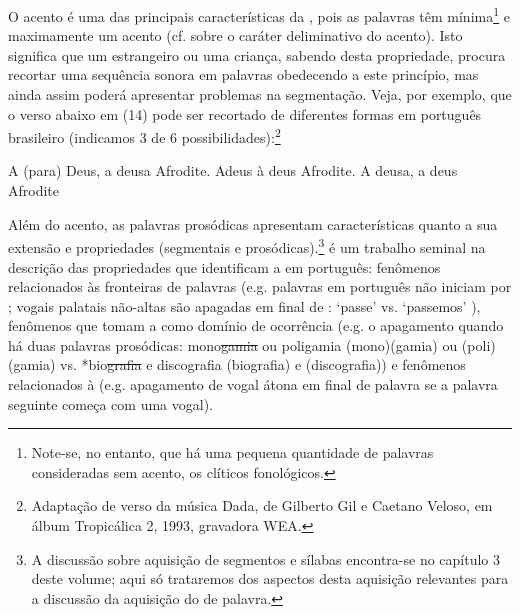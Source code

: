 \documentclass[output=paper]{LSP/langsci}
\begin{document}
O acento é uma das principais características da , pois as palavras têm mínima\footnote{Note-se, no entanto, que há uma pequena quantidade de palavras consideradas sem acento, os clíticos fonológicos.} e maximamente um acento (cf. \citealt{jakobson1941} sobre o caráter deliminativo do acento). Isto significa que um estrangeiro ou uma criança, sabendo desta propriedade, procura recortar uma sequência sonora em palavras obedecendo a este princípio, mas ainda assim poderá apresentar problemas na segmentação. Veja, por exemplo, que o verso abaixo em (14) pode ser recortado de diferentes formas em português brasileiro (indicamos 3 de 6 possibilidades):\footnote{Adaptação de verso da música Dada, de Gilberto Gil e Caetano Veloso, em álbum Tropicálica 2, 1993, gravadora WEA.}\newpage

\ea\label{ex:santana_14}
\ea\label{ex:santana_14a}
A (para) Deus, a deusa Afrodite.
\ex\label{ex:santana_14b}
Adeus à deus Afrodite.
\ex\label{ex:santana_14c}
A deusa, a deus Afrodite
\zl

Além do acento, as palavras prosódicas apresentam características quanto a sua extensão e propriedades (segmentais e prosódicas).\footnote{A discussão sobre aquisição de segmentos e sílabas encontra-se no capítulo 3 deste volume; aqui só trataremos dos aspectos desta aquisição relevantes para a discussão da aquisição do  de palavra.} \citet{vigario2003} é um trabalho seminal na descrição das propriedades que identificam a  em português: fenômenos relacionados às fronteiras de palavras (e.g. palavras em português não iniciam por \ipa{[\textltailn,R,L]}; vogais palatais não-altas são apagadas em final de : `passe'  vs. `passemos' ), fenômenos que tomam a  como domínio de ocorrência (e.g. o apagamento quando há duas palavras prosódicas: mono\sout{gamia} ou poligamia (mono)(gamia) ou (poli)(gamia) vs. *bio\sout{grafia} e discografia (biografia) e (discografia)) e fenômenos relacionados à  (e.g. apagamento de vogal átona em final de palavra se a palavra seguinte começa com uma vogal). 
\end{document}
